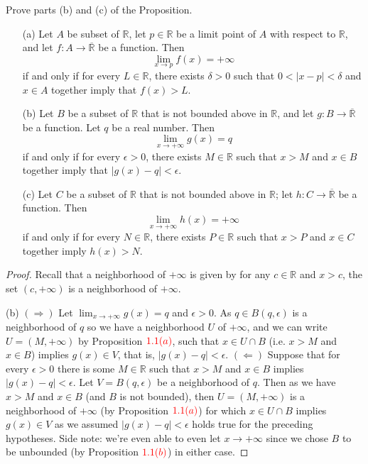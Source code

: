 \documentclass[oneside]{amsart}
\theoremstyle{definition}
\newcommand{\rr}{\mathbb R}
\begin{document}
\begin{tcolorbox}[colback=black!5!white,colframe=black!75!black,title= Exercise $1.1.$]  Prove parts (b) and (c) of the Proposition.
\begin{itemize}
	\item [(a)] Let $A$ be subset of $\rr$, let $p \in \rr$ be a limit point of $A$ with respect to $\rr$, and let $f \colon A \to \overline{\rr}$ be a function. Then $$ \lim_{x \to p}f(x) = + \infty$$ if and only if for every $L \in \rr$, there exists $\delta > 0$ such that $0< |x-p|< \delta$ and $x \in A$ together imply that $f(x) > L$.
	\item [(b)] Let $B$ be a subset of $\rr$ that is not bounded above in $\rr$, and let $g \colon B \to \overline{\rr}$ be a function. Let $q$ be a real number. Then $$ \lim_{x \to + \infty} g(x) = q$$ if and only if for every $\epsilon > 0$, there exists $M \in \rr$ such that $x > M$ and $x \in B$ together imply that $ | g(x) -q| < \epsilon$.
	\item [(c)] Let $C$ be a subset of $\rr$ that is not bounded above in $\rr$; let $h \colon C \to \overline{\rr}$ be a function. Then $$ \lim_{x \to + \infty} h(x) = +\infty$$ if and only if for every $N \in \rr$, there exists $P \in \rr$ such that $x >P$ and $x \in C$ together imply $h(x) > N$.
\end{itemize}	
\tcblower 
\begin{proof} Recall that a neighborhood of $+\infty$ is given by for any $c \in \rr$ and $x > c$, the set $(c, +\infty)$ is a neighborhood of $+\infty$.

(b) $(\Rightarrow)$ Let $\lim_{x\to +\infty} g(x) = q$ and $\epsilon > 0$. As $q \in B (q, \epsilon)$ is a neighborhood of $q$ so we have a neighborhood $U$ of $+\infty$, and we can write $U = (M, + \infty)$ by Proposition $\textcolor{red}{1.1 (a)}$, such that $x \in U \cap B$ (i.e. $x>M$ and $x \in B$) implies $g(x) \in V$, that is, $|g(x)-q| < \epsilon$. $(\Leftarrow)$ Suppose that for every $\epsilon > 0$ there is some $M \in \rr$ such that $x > M$ and $x \in B$ implies $|g(x)-q|<\epsilon$. Let $V  = B (q, \epsilon)$ be a neighborhood of $q$. Then as we have $x > M$ and $x \in B$ (and $B$ is not bounded), then $ U = (M, + \infty)$ is a neighborhood of $+\infty$ (by Proposition $\textcolor{red}{1.1 (a)}$) for which $x \in U \cap B$ implies $g(x) \in V$ as we assumed $|g(x)-q| < \epsilon$ holds true for the preceding hypotheses. Side note: we're even able to even let $x \to +\infty$ since we chose $B$  to be unbounded (by Proposition $\textcolor{red}{1.1 (b)}$) in either case.


\end{proof}
\end{tcolorbox}
\end{document}
